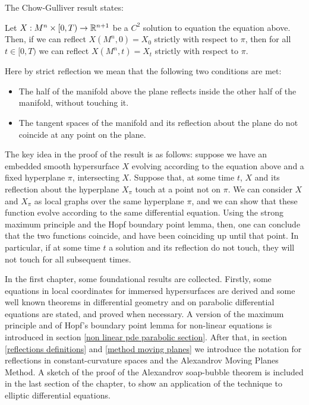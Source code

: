 The Chow-Gulliver result states:

\begin{theorem*}
	Let $X:M^n\times [0,T) \rightarrow \mathbb{R}^{n+1}$ be a $C^2$ solution to equation the equation above. Then, if we can reflect $X(M^n, 0)=X_0$ strictly with respect to $\pi$, then for all $t\in [0,T)$ we can reflect $X(M^n, t)=X_t$ strictly with respect to $\pi$. 
\end{theorem*}

Here by strict reflection we mean that the following two conditions are met: 
\begin{itemize}
	\item The half of the manifold above the plane reflects inside the other half of the manifold, without touching it.
	\item The tangent spaces of the manifold and its reflection about the plane do not coincide at any point on the plane.
\end{itemize}

The key idea in the proof of the result is as follows: suppose we have an embedded smooth hypersurface $X$ evolving according to the equation above and a fixed hyperplane $\pi$, intersecting $X$. Suppose that, at some time $t$, $X$ and  its reflection about the hyperplane $X_\pi$ touch at a point not on $\pi$. We can consider $X$ and  $X_\pi$ as local graphs over the same hyperplane $\pi$, and we can show that these function evolve according to the same differential equation. Using the strong maximum principle and the Hopf boundary point lemma, then, one can conclude that the two functions coincide, and have been coinciding up until that point. In particular, if at some time $t$ a solution and its reflection do not touch, they will not touch for all subsequent times. 

In the first chapter, some foundational results are collected. Firstly, some equations in local coordinates for immersed hypersurfaces are derived and some well known theorems in differential geometry and on parabolic differential equations are stated, and proved when necessary. A version of the maximum principle and of Hopf's boundary point lemma for non-linear equations is introduced in section \ref{non linear pde parabolic section}. After that, in section \ref{reflections definitions} and 
\ref{method moving planes} we introduce the notation for reflections in constant-curvature spaces and the Alexandrov Moving Planes Method. A sketch of the proof of the Alexandrov soap-bubble theorem is included in the last section of the chapter, to show an application of the technique to elliptic differential equations. 

